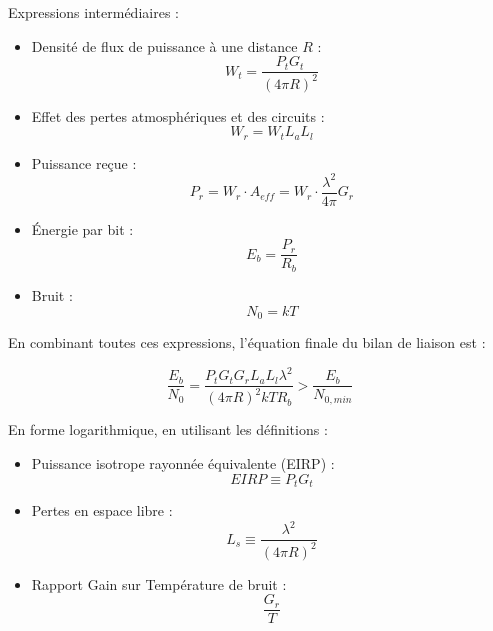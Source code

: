 Expressions intermédiaires :

\begin{itemize}
    \item Densité de flux de puissance à une distance $R$ :
    \begin{equation}
        W_t = \frac{P_t G_t}{(4\pi R)^2}
    \end{equation}
    
    \item Effet des pertes atmosphériques et des circuits :
    \begin{equation}
        W_r = W_t L_a L_l
    \end{equation}
    
    \item Puissance reçue :
    \begin{equation}
        P_r = W_r \cdot A_{eff} = W_r \cdot \frac{\lambda^2}{4\pi} G_r
    \end{equation}
    
    \item Énergie par bit :
    \begin{equation}
        E_b = \frac{P_r}{R_b}
    \end{equation}
    
    \item Bruit :
    \begin{equation}
        N_0 = kT
    \end{equation}
\end{itemize}

En combinant toutes ces expressions, l'équation finale du bilan de liaison est :

\begin{equation}
    \frac{E_b}{N_0} = \frac{P_t G_t G_r L_a L_l \lambda^2}{(4\pi R)^2 k T R_b} > \frac{E_b}{N_{0,min}}
\end{equation}

En forme logarithmique, en utilisant les définitions :

\begin{itemize}
    \item Puissance isotrope rayonnée équivalente (EIRP) :
    \begin{equation}
        EIRP \equiv P_t G_t
    \end{equation}
    
    \item Pertes en espace libre :
    \begin{equation}
        L_s \equiv \frac{\lambda^2}{(4\pi R)^2}
    \end{equation}
    
    \item Rapport Gain sur Température de bruit :
    \begin{equation}
        \frac{G_r}{T}
    \end{equation}
\end{itemize}

